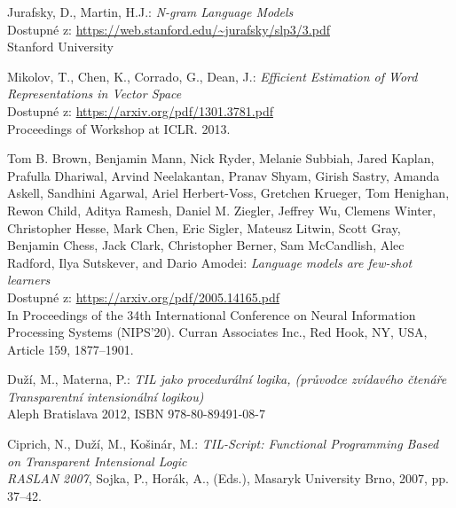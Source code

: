 \documentclass[czech,master]{diploma}
\begin{document}
\MakeTitlePages

\listoffigures
\clearpage

\listoftables
\clearpage









\renewcommand{\bibname}{Zdroje}
\begin{thebibliography}{50}

Jurafsky, D., Martin, H.J.: \textit{N-gram Language Models}\\
Dostupné z: \url{https://web.stanford.edu/~jurafsky/slp3/3.pdf}\\
Stanford University

Mikolov, T., Chen, K., Corrado, G., Dean, J.: \textit{Efficient Estimation of Word Representations in Vector Space}\\
Dostupné z: \url{https://arxiv.org/pdf/1301.3781.pdf}\\
Proceedings of Workshop at ICLR. 2013.

Tom B. Brown, Benjamin Mann, Nick Ryder, Melanie Subbiah, Jared Kaplan, Prafulla Dhariwal, Arvind Neelakantan, Pranav Shyam, Girish Sastry, Amanda Askell, Sandhini Agarwal, Ariel Herbert-Voss, Gretchen Krueger, Tom Henighan, Rewon Child, Aditya Ramesh, Daniel M. Ziegler, Jeffrey Wu, Clemens Winter, Christopher Hesse, Mark Chen, Eric Sigler, Mateusz Litwin, Scott Gray, Benjamin Chess, Jack Clark, Christopher Berner, Sam McCandlish, Alec Radford, Ilya Sutskever, and Dario Amodei: \textit{Language models are few-shot learners}\\
Dostupné z: \url{https://arxiv.org/pdf/2005.14165.pdf}\\
In Proceedings of the 34th International Conference on Neural Information Processing Systems (NIPS'20). Curran Associates Inc., Red Hook, NY, USA, Article 159, 1877–1901.

Duží, M., Materna, P.: \textit{TIL jako procedurální logika, (průvodce zvídavého čtenáře Transparentní intensionální logikou)} \\
Aleph Bratislava 2012, ISBN 978-80-89491-08-7

Ciprich, N., Duží, M., Košinár, M.: \textit{TIL-Script: Functional Programming Based on Transparent Intensional Logic} \\
\textit{RASLAN 2007}, Sojka, P., Horák, A., (Eds.), Masaryk University Brno, 2007, pp. 37–42.


\end{thebibliography}
\end{document}
